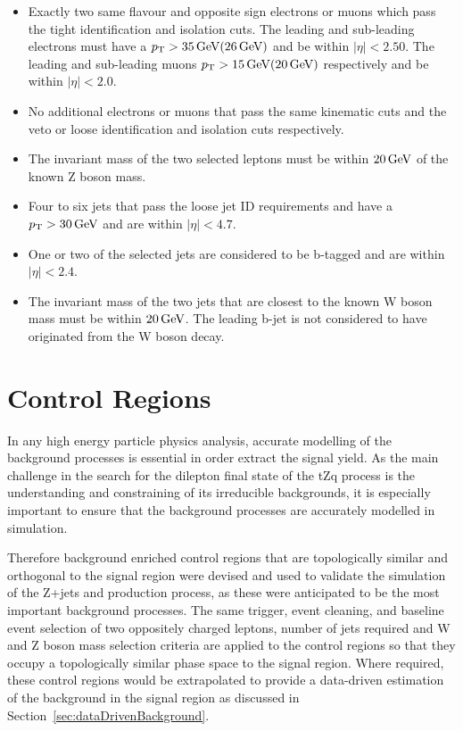 \begin{itemize}
\item Exactly two same flavour and opposite sign electrons or muons which pass the tight identification and isolation cuts. The leading and sub-leading electrons must have a $p_{\mathrm{T}} > 35\,\text{Ge\hspace{-.08em}V} (26\,\text{Ge\hspace{-.08em}V})$ and be within $|\eta| < 2.50$. The leading and sub-leading muons $p_{\mathrm{T}} > 15\,\text{Ge\hspace{-.08em}V} (20\,\text{Ge\hspace{-.08em}V})$ respectively and be within $|\eta| < 2.0$.
\item  No additional electrons or muons that pass the same kinematic cuts and the veto or loose identification and isolation cuts respectively. 
\item The invariant mass of the two selected leptons must be within $20\,\text{Ge\hspace{-.08em}V}$ of the known Z boson mass.
\item Four to six jets that pass the loose jet ID requirements and have a $p_{\mathrm{T}} > 30\,\text{Ge\hspace{-.08em}V}$ and are within $|\eta| < 4.7$.
\item One or two of the selected jets are considered to be b-tagged and are within $|\eta| < 2.4$.
\item The invariant mass of the two jets that are closest to the known W boson mass must be within $20\,\text{Ge\hspace{-.08em}V}$. The leading b-jet is not considered to have originated from the W boson decay.
\end{itemize}


\section{Control Regions}\label{sec:controlRegions}
In any high energy particle physics analysis, accurate modelling of the background processes is essential in order extract the signal yield.
As the main challenge in the search for the dilepton final state of the tZq process is the understanding and constraining of its irreducible backgrounds, it is especially important to ensure that the background processes are accurately modelled in simulation.

Therefore background enriched control regions that are topologically similar and orthogonal to the signal region were devised and used to validate the simulation of the Z+jets and \ttbar production process, as these were anticipated to be the most important background processes.
The same trigger, event cleaning, and baseline event selection of two oppositely charged leptons, number of jets required and W and Z boson mass selection criteria are applied to the control regions so that they occupy a topologically similar phase space to the signal region.
Where required, these control regions would be extrapolated to provide a data-driven estimation of the background in the signal region as discussed in Section~\ref{sec:dataDrivenBackground}.

